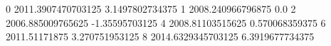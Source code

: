 0 2011.3907470703125 3.1497802734375
1 2008.240966796875 0.0
2 2006.885009765625 -1.35595703125
4 2008.81103515625 0.570068359375
6 2011.51171875 3.270751953125
8 2014.6329345703125 6.3919677734375
